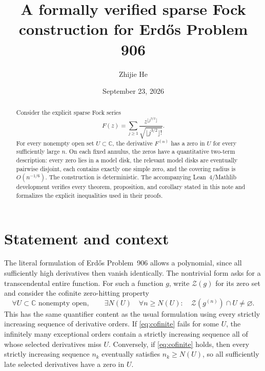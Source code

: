 \documentclass[11pt,reqno]{amsart}
\title[Formalized sparse Fock construction]{A formally verified sparse Fock construction for Erd\H{o}s Problem 906}
\author{Zhijie He}
\date{September 23, 2026}
\numberwithin{equation}{section}
\theoremstyle{remark}
\newcommand{\C}{\mathbb C}
\newcommand{\Zer}{\mathcal Z}
\begin{document}
\raggedbottom

\begin{abstract}
Consider the explicit sparse Fock series
\[
 F(z)=\sum_{j\ge1}\frac{z^{\lfloor j^{3/2}\rfloor}}{\sqrt{\lfloor j^{3/2}\rfloor!}}.
\]
For every nonempty open set $U\subset\C$, the derivative $F^{(n)}$ has a zero in $U$ for every sufficiently large $n$.  On each fixed annulus, the zeros have a quantitative two-term description: every zero lies in a model disk, the relevant model disks are eventually pairwise disjoint, each contains exactly one simple zero, and the covering radius is $O(n^{-1/6})$.  The construction is deterministic.  The accompanying Lean~4/Mathlib development verifies every theorem, proposition, and corollary stated in this note and formalizes the explicit inequalities used in their proofs.
\end{abstract}
\maketitle

\section{Statement and context}\label{sec:intro}

The literal formulation of Erd\H{o}s Problem~906 allows a polynomial, since all sufficiently high derivatives then vanish identically.  The nontrivial form asks for a transcendental entire function.  For such a function $g$, write $\Zer(g)$ for its zero set and consider the cofinite zero-hitting property
\begin{equation}\label{eq:cofinite}
 \forall U\subset\C\text{ nonempty open},\qquad
 \exists N(U)\quad\forall n\ge N(U):\quad \Zer(g^{(n)})\cap U\ne\varnothing.
\end{equation}
This has the same quantifier content as the usual formulation using every strictly increasing sequence of derivative orders.  If \eqref{eq:cofinite} fails for some $U$, the infinitely many exceptional orders contain a strictly increasing sequence all of whose selected derivatives miss $U$.  Conversely, if \eqref{eq:cofinite} holds, then every strictly increasing sequence $n_k$ eventually satisfies $n_k\ge N(U)$, so all sufficiently late selected derivatives have a zero in $U$.
\end{document}
